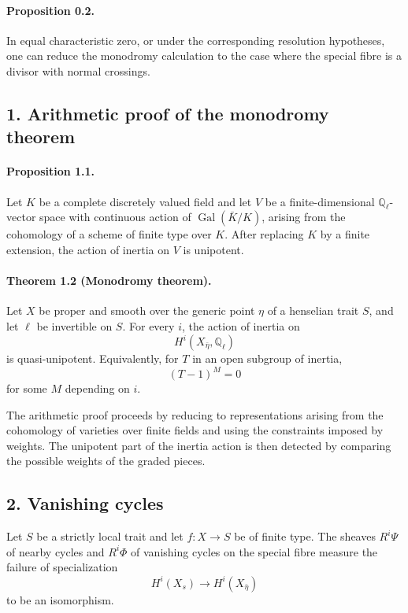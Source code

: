 \documentclass[11pt]{article}
\theoremstyle{plain}
\theoremstyle{definition}
\theoremstyle{remark}
\newcommand{\QQ}{\mathbb Q}
\DeclareMathOperator{\Gal}{Gal}
\begin{document}
\paragraph{Proposition 0.2.}
In equal characteristic zero, or under the corresponding resolution hypotheses, one can reduce the monodromy calculation to the case where the special fibre is a divisor with normal crossings.

\subsection*{1. Arithmetic proof of the monodromy theorem}

\paragraph{Proposition 1.1.}
Let $K$ be a complete discretely valued field and let $V$ be a finite-dimensional $\QQ_\ell$-vector space with continuous action of $\Gal(\bar K/K)$, arising from the cohomology of a scheme of finite type over $K$. After replacing $K$ by a finite extension, the action of inertia on $V$ is unipotent.

\paragraph{Theorem 1.2 (Monodromy theorem).}
Let $X$ be proper and smooth over the generic point $\eta$ of a henselian trait $S$, and let $\ell$ be invertible on $S$. For every $i$, the action of inertia on
\[
H^i(X_{\bar\eta},\QQ_\ell)
\]
is quasi-unipotent. Equivalently, for $T$ in an open subgroup of inertia,
\[
(T-1)^M=0
\]
for some $M$ depending on $i$.

The arithmetic proof proceeds by reducing to representations arising from the cohomology of varieties over finite fields and using the constraints imposed by weights. The unipotent part of the inertia action is then detected by comparing the possible weights of the graded pieces.

\subsection*{2. Vanishing cycles}

Let $S$ be a strictly local trait and let $f:X\to S$ be of finite type. The sheaves $R^i\Psi$ of nearby cycles and $R^i\Phi$ of vanishing cycles on the special fibre measure the failure of specialization
\[
H^i(X_s)\to H^i(X_{\bar\eta})
\]
to be an isomorphism.
\end{document}
